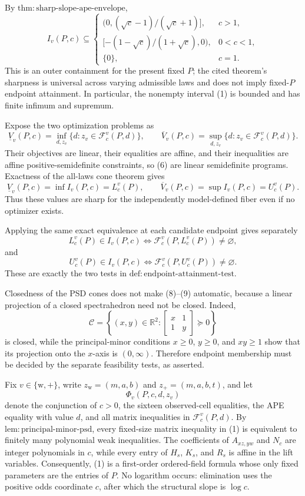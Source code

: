 By \(\mathrm{thm{:}sharp\text{-}slope\text{-}ape\text{-}envelope}\),
\[
 I_v(P,c)\subseteq
 \begin{cases}
 (0,(\sqrt c-1)/(\sqrt c+1)],&c>1,\\
 [-(1-\sqrt c)/(1+\sqrt c),0),&0<c<1,\\
 \{0\},&c=1.
 \end{cases} \tag{5}
\]
This is an outer containment for the present fixed \(P\); the cited theorem's sharpness is universal across varying admissible laws and does not imply fixed-\(P\) endpoint attainment.  In particular, the nonempty interval (1) is bounded and has finite infimum and supremum.

Expose the two optimization problems as
\[
 \underline V_v(P,c)=\inf_{d,z_v}\{d:z_v\in\mathcal F_c^v(P,d)\},
 \qquad
 \overline V_v(P,c)=\sup_{d,z_v}\{d:z_v\in\mathcal F_c^v(P,d)\}. \tag{6}
\]
Their objectives are linear, their equalities are affine, and their inequalities are affine positive-semidefinite constraints, so (6) are linear semidefinite programs.  Exactness of the all-laws cone theorem gives
\[
 \underline V_v(P,c)=\inf I_v(P,c)=L_c^v(P),
 \qquad
 \overline V_v(P,c)=\sup I_v(P,c)=U_c^v(P). \tag{7}
\]
Thus these values are sharp for the independently model-defined fiber even if no optimizer exists.

Applying the same exact equivalence at each candidate endpoint gives separately
\[
 L_c^v(P)\in I_v(P,c)
 \Longleftrightarrow
 \mathcal F_c^v(P,L_c^v(P))\ne\varnothing, \tag{8}
\]
and
\[
 U_c^v(P)\in I_v(P,c)
 \Longleftrightarrow
 \mathcal F_c^v(P,U_c^v(P))\ne\varnothing. \tag{9}
\]
These are exactly the two tests in \(\mathrm{def{:}endpoint\text{-}attainment\text{-}test}\).

Closedness of the PSD cones does not make (8)--(9) automatic, because a linear projection of a closed spectrahedron need not be closed.  Indeed,
\[
 \mathcal C=\left\{(x,y)\in\mathbb R^2:
 \begin{bmatrix}x&1\\1&y\end{bmatrix}\succeq0\right\}
\]
is closed, while the principal-minor conditions \(x\ge0\), \(y\ge0\), and \(xy\ge1\) show that its projection onto the \(x\)-axis is \((0,\infty)\).  Therefore endpoint membership must be decided by the separate feasibility tests, as asserted.

Fix \(v\in\{\mathrm w,+\}\), write \(z_{\mathrm w}=(m,a,b)\) and \(z_+=(m,a,b,t)\), and let
\[
 \Phi_v(P,c,d,z_v) \tag{1}
\]
denote the conjunction of \(c>0\), the sixteen observed-cell equalities, the APE equality with value \(d\), and all matrix inequalities in \(\mathcal F_c^v(P,d)\).  By \(\mathrm{lem{:}principal\text{-}minor\text{-}psd}\), every fixed-size matrix inequality in (1) is equivalent to finitely many polynomial weak inequalities.  The coefficients of \(A_{xz,yw}\) and \(N_c\) are integer polynomials in \(c\), while every entry of \(H_s\), \(K_s\), and \(R_s\) is affine in the lift variables.  Consequently, (1) is a first-order ordered-field formula whose only fixed parameters are the entries of \(P\).  No logarithm occurs: elimination uses the positive odds coordinate \(c\), after which the structural slope is \(\log c\).

